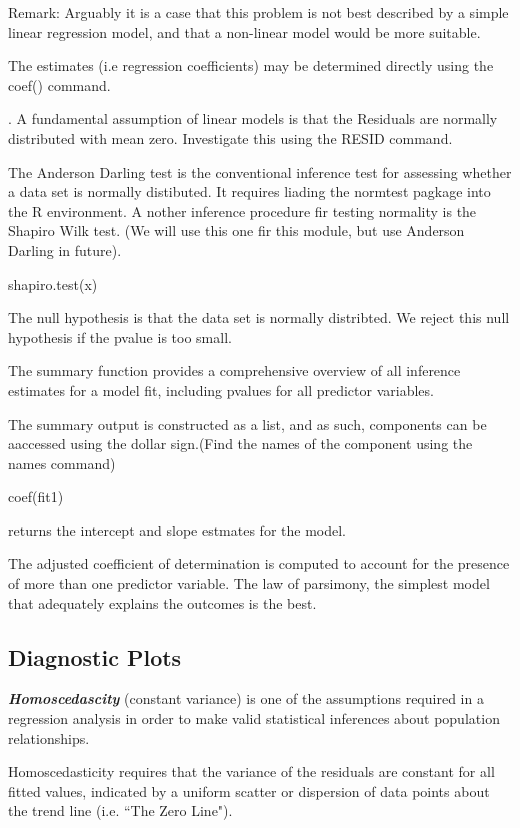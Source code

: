 \documentclass[a4paper,12pt]{article}
\begin{document}
Remark: Arguably it is a case that this problem is not best described by a simple linear regression model, and that a non-linear model would be more suitable.

The estimates (i.e regression coefficients) may be determined directly using the 
coef() command.

.
A fundamental assumption of linear models is that the
Residuals are normally distributed with mean zero. Investigate this using the RESID command.

The Anderson Darling test is the conventional inference test for assessing whether a data set is normally distibuted. It requires liading the normtest pagkage into the R environment. A nother inference procedure fir testing normality is the Shapiro Wilk test. (We will use this one fir this module, but use Anderson Darling in future).

shapiro.test(x)

The null hypothesis is that the data set is normally distribted. We reject this null hypothesis if the pvalue is too small.

The summary function provides a comprehensive overview of all inference estimates for a model fit, including pvalues for all predictor variables.

The summary output is constructed as a list, and as such, components can be aaccessed using the dollar sign.(Find the names of the component using the names command)

coef(fit1)

returns the intercept and slope estmates for the model.

The adjusted coefficient of determination is computed to account for the presence of more than one predictor variable.
The law of parsimony, the simplest model that adequately explains the outcomes is the best.






\subsection{Diagnostic Plots}
\textbf{\emph{Homoscedascity }}(constant variance) is one of the assumptions required in a regression analysis in order to make valid statistical inferences about population relationships.

Homoscedasticity requires that the variance of the residuals are constant for all fitted values, indicated by a uniform scatter or dispersion of data points about the trend line (i.e. ``The Zero Line").
\end{document}
